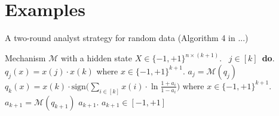 
\section{Examples}


\begin{algorithm}
\caption{A two-round analyst strategy for random data (Algorithm 4 in ...)}
\label{alg:BitGOF}
\begin{algorithmic}
\REQUIRE Mechanism $\mathcal{M}$ with a hidden state $X\in \{-1,+1\}^{n\times (k+1)}$.
\ $j\in [k]$\ {\bf do}.  
\STATE {} $q_j(x)=x(j)\cdot x(k)$ where $x\in \{-1,+1\}^{k+1}$.
\STATE {} $a_j=\mathcal{M}(q_j)$ 
\STATE \qquad {}
 $q_{k}(x)= x(k) \cdot \mathrm{sign}\big (\sum_{i\in [k]} x(i) \cdot \ln\frac{1+a_i}{1-a_i} \big )$ where $x\in \{-1,+1\}^{k+1}$.
\STATE{}
 $a_{k+1}=\mathcal{M}(q_{k+1})$
\STATE{}
\RETURN $a_{k+1}$.
\ENSURE $a_{k+1}\in [-1,+1]$
\end{algorithmic}
\end{algorithm}





\newpage


